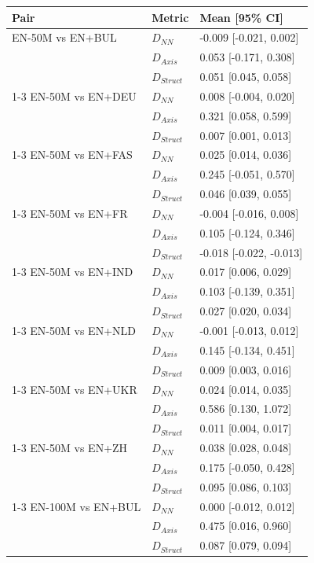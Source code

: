 \begin{tabular}{@{}lll@{}}
\toprule
Pair & Metric & Mean [95\% CI] \\
\midrule
EN-50M vs EN+BUL & $D_{NN}$ & -0.009 [-0.021, 0.002] \\
 & $D_{Axis}$ & 0.053 [-0.171, 0.308] \\
 & $D_{Struct}$ & 0.051 [0.045, 0.058] \\
\cmidrule(lr){1-3}
EN-50M vs EN+DEU & $D_{NN}$ & 0.008 [-0.004, 0.020] \\
 & $D_{Axis}$ & 0.321 [0.058, 0.599] \\
 & $D_{Struct}$ & 0.007 [0.001, 0.013] \\
\cmidrule(lr){1-3}
EN-50M vs EN+FAS & $D_{NN}$ & 0.025 [0.014, 0.036] \\
 & $D_{Axis}$ & 0.245 [-0.051, 0.570] \\
 & $D_{Struct}$ & 0.046 [0.039, 0.055] \\
\cmidrule(lr){1-3}
EN-50M vs EN+FR & $D_{NN}$ & -0.004 [-0.016, 0.008] \\
 & $D_{Axis}$ & 0.105 [-0.124, 0.346] \\
 & $D_{Struct}$ & -0.018 [-0.022, -0.013] \\
\cmidrule(lr){1-3}
EN-50M vs EN+IND & $D_{NN}$ & 0.017 [0.006, 0.029] \\
 & $D_{Axis}$ & 0.103 [-0.139, 0.351] \\
 & $D_{Struct}$ & 0.027 [0.020, 0.034] \\
\cmidrule(lr){1-3}
EN-50M vs EN+NLD & $D_{NN}$ & -0.001 [-0.013, 0.012] \\
 & $D_{Axis}$ & 0.145 [-0.134, 0.451] \\
 & $D_{Struct}$ & 0.009 [0.003, 0.016] \\
\cmidrule(lr){1-3}
EN-50M vs EN+UKR & $D_{NN}$ & 0.024 [0.014, 0.035] \\
 & $D_{Axis}$ & 0.586 [0.130, 1.072] \\
 & $D_{Struct}$ & 0.011 [0.004, 0.017] \\
\cmidrule(lr){1-3}
EN-50M vs EN+ZH & $D_{NN}$ & 0.038 [0.028, 0.048] \\
 & $D_{Axis}$ & 0.175 [-0.050, 0.428] \\
 & $D_{Struct}$ & 0.095 [0.086, 0.103] \\
\cmidrule(lr){1-3}
EN-100M vs EN+BUL & $D_{NN}$ & 0.000 [-0.012, 0.012] \\
 & $D_{Axis}$ & 0.475 [0.016, 0.960] \\
 & $D_{Struct}$ & 0.087 [0.079, 0.094] \\

\end{tabular}
